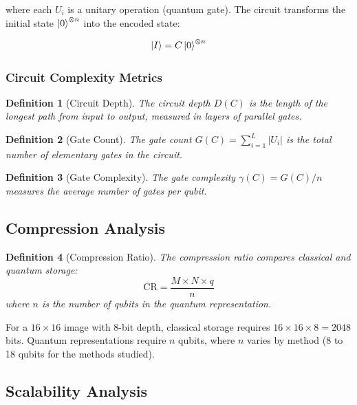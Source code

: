 \documentclass[pdflatex,sn-mathphys-num,Numbered]{sn-jnl}
\theoremstyle{thmstyleone}
\theoremstyle{thmstyletwo}
\theoremstyle{thmstylethree}
\newtheorem{definition}{Definition}
\begin{document}
where each $U_i$ is a unitary operation (quantum gate). The circuit transforms the initial state $\ket{0}^{\otimes n}$ into the encoded state:

\begin{equation}
\ket{I} = C \ket{0}^{\otimes n}
\label{eq:encoding}
\end{equation}

\subsubsection{Circuit Complexity Metrics}

\begin{definition}[Circuit Depth]
The circuit depth $D(C)$ is the length of the longest path from input to output, measured in layers of parallel gates.
\end{definition}

\begin{definition}[Gate Count]
The gate count $G(C) = \sum_{i=1}^{L} |U_i|$ is the total number of elementary gates in the circuit.
\end{definition}

\begin{definition}[Gate Complexity]
The gate complexity $\gamma(C) = G(C) / n$ measures the average number of gates per qubit.
\end{definition}

\subsection{Compression Analysis}

\begin{definition}[Compression Ratio]
The compression ratio compares classical and quantum storage:
\begin{equation}
\text{CR} = \frac{M \times N \times q}{n}
\label{eq:compression}
\end{equation}
where $n$ is the number of qubits in the quantum representation.
\end{definition}

For a $16 \times 16$ image with 8-bit depth, classical storage requires $16 \times 16 \times 8 = 2048$ bits. Quantum representations require $n$ qubits, where $n$ varies by method (8 to 18 qubits for the methods studied).

\subsection{Scalability Analysis}
\end{document}
